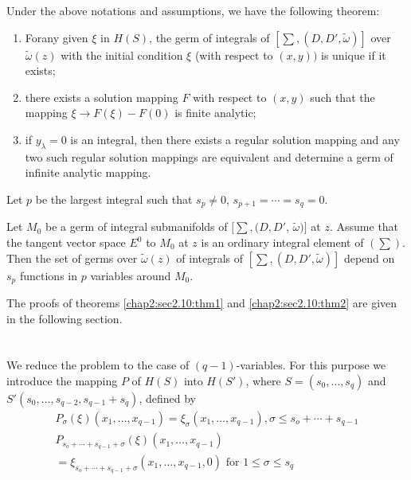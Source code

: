 Under the above notations and assumptions, we have the following theorem:
\setcounter{theorem}{0}
\begin{theorem}\label{chap2:sec2.10:thm1}%
  \begin{enumerate} [\rm (i)]
  \item For\pageoriginale any given $\xi$ in $H(S)$, the germ of integrals of $[
    \sum, (D, D', \tilde{\omega} )]$ over $\tilde{\omega} (z)$ with
    the initial condition $\xi$ (with respect to $(x,y))$ is unique if
    it exists; 
  \item there exists a solution mapping $F$ with respect to $(x, y)$
    such that the mapping  $\xi \to F(\xi)- F(0)$ is finite analytic; 
  \item if $y_\lambda = 0$ is an integral, then there exists a regular
    solution mapping and any two such regular solution mappings are
    equivalent and determine a germ of infinite analytic mapping. 
  \end{enumerate}
  
  Let $p$ be the largest integral such that $s_p \neq 0$, $s_{p +1} =
  \cdots = s_q = 0$. 
\end{theorem} 

\begin{theorem}\label{chap2:sec2.10:thm2}%
  Let $M_0$ be a germ of integral submanifolds of $[\sum, (D,D'$,
    $\tilde{\omega})]$ at $z$. Assume that the tangent vector space
  $E^0$ to $M_0$ at $z$ is an ordinary integral element of
  $(\sum)$. Then the set of germs over $\tilde{\omega} (z)$ of
  integrals of $[ \sum , (D, D' , \tilde{\omega})]$ depend on $s_p$
  functions in $p$ variables around $M_0$. 
\end{theorem} 

The proofs of theorems \ref{chap2:sec2.10:thm1} and
\ref{chap2:sec2.10:thm2} are given in the following section. 

\section{}\label{chap2:sec2.11} %
 
We reduce the problem to the case of $(q-1)$-variables. For this
purpose we introduce the mapping $P$ of $H(S)$ into $H(S')$, where $S=
(s_0, \ldots , s_q)$ and $S' (s_0, \ldots, s_{q-2}, s_{q-1} +  s_q)$,
defined by  
\begin{multline*}
  P_\sigma ( \xi) (x_1, \ldots , x_{q-1})  = \xi_\sigma (x_1 , \ldots,
  x_{q-1}) , \sigma  \le s_o + \cdots + s_{q-1} \\ 
  P_{s_o+ \cdots +  s_{q-1}+ \sigma} ( \xi) (x_1 , \ldots , x_{q-1})\\
   = \xi_{s_o+  \cdots + s_{q-1} +  \sigma} (x_1 , \ldots , x_{q-1}, 0)
  \text{ for } 1 \le \sigma \le s_q  
\end{multline*}
 
